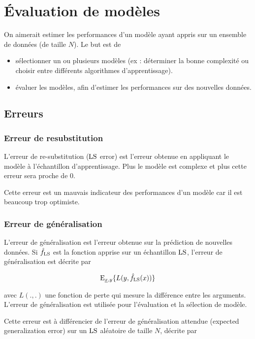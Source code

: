 \chapter{Évaluation de modèles}

On aimerait estimer les performances d'un modèle ayant appris sur un ensemble de données (de taille $N$). Le but est de

\begin{itemize}
	\item sélectionner un ou plusieurs modèles (ex : déterminer la bonne complexité ou choisir entre différents algorithmes d'apprentissage).
	\item évaluer les modèles, afin d'estimer les performances sur des nouvelles données.
\end{itemize}


\section{Erreurs}
	\subsection{Erreur de resubstitution}
	
	L'erreur de re-substitution ($\text{LS}$ error) est l'erreur obtenue en appliquant le modèle à l'échantillon d'apprentissage. Plus le modèle est complexe et plus cette erreur sera proche de 0.
	
	Cette erreur est un mauvais indicateur des performances d'un modèle car il est beaucoup trop optimiste.
	
	\subsection{Erreur de généralisation}

	L'erreur de généralisation est l'erreur obtenue sur la prédiction de nouvelles données. Si $\hat{f}_{\text{LS}}$ est la fonction apprise sur un échantillon $\text{LS}$, l'erreur de généralisation est décrite par

	$$\text{E}_{\underline{x}, y}\lbrace L(y, \hat{f}_{\text{LS}}(x)) \rbrace$$

	avec $L(., .)$ une fonction de perte qui mesure la différence entre les arguments. L'erreur de généralisation est utilisée pour l'évaluation et la sélection de modèle.

	Cette erreur est à différencier de l'erreur de généralisation attendue (expected generalization error) sur un $\text{LS}$ aléatoire de taille $N$, décrite par 
	
